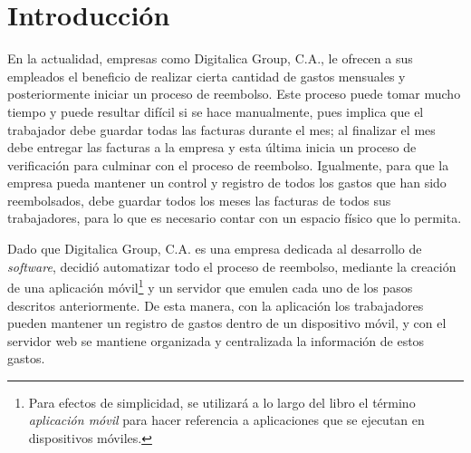 \chapter*{Introducción} \label{sec:Introduccion}

\vspace{5 mm}
En la actualidad, empresas como Digitalica Group, C.A., le ofrecen a sus empleados el beneficio de realizar cierta cantidad de gastos mensuales y posteriormente iniciar un proceso de reembolso. Este proceso puede tomar mucho tiempo y puede resultar difícil si se hace manualmente, pues implica que el trabajador debe guardar todas las facturas durante el mes; al finalizar el mes debe entregar las facturas a la empresa y esta última inicia un proceso de verificación para culminar con el proceso de reembolso. Igualmente, para que la empresa pueda mantener un control y registro de todos los gastos que han sido reembolsados, debe guardar todos los meses las facturas de todos sus trabajadores, para lo que es necesario contar con un espacio físico que lo permita. 

Dado que Digitalica Group, C.A. es una empresa dedicada al desarrollo de \textit{software}, decidió automatizar todo el proceso de reembolso, mediante la creación de una aplicación móvil\footnote{Para efectos de simplicidad, se utilizará a lo largo del libro el término \textit{aplicación móvil} para hacer referencia a aplicaciones que se ejecutan en dispositivos móviles.} y un servidor que emulen cada uno de los pasos descritos anteriormente. De esta manera, con la aplicación los trabajadores pueden mantener un registro de gastos dentro de un dispositivo móvil, y con el servidor web se mantiene organizada y centralizada la información de estos gastos.



